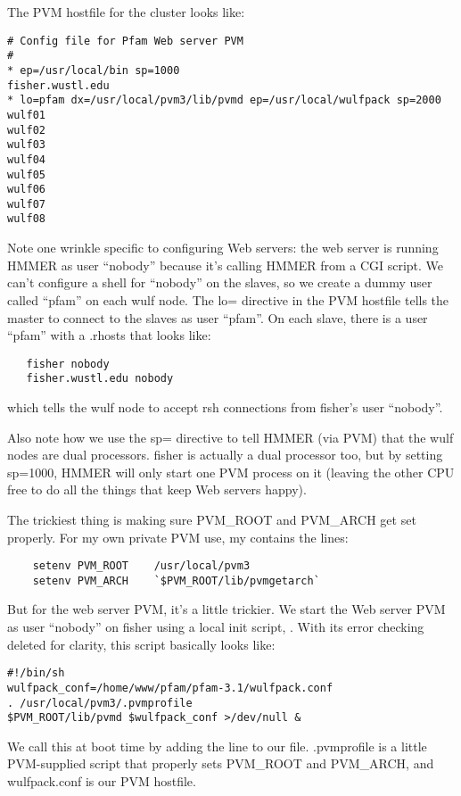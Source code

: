 The PVM hostfile for the cluster looks like:
\begin{verbatim}
# Config file for Pfam Web server PVM
#
* ep=/usr/local/bin sp=1000
fisher.wustl.edu
* lo=pfam dx=/usr/local/pvm3/lib/pvmd ep=/usr/local/wulfpack sp=2000
wulf01
wulf02
wulf03
wulf04
wulf05
wulf06
wulf07
wulf08
\end{verbatim}

Note one wrinkle specific to configuring Web servers: the web server
is running HMMER as user ``nobody'' because it's calling HMMER from a
CGI script. We can't configure a shell for ``nobody'' on the slaves,
so we create a dummy user called ``pfam'' on each wulf node.  The lo=
directive in the PVM hostfile tells the master to connect to the
slaves as user ``pfam''. On each slave, there is a user ``pfam'' with
a .rhosts that looks like:
\begin{verbatim}
   fisher nobody
   fisher.wustl.edu nobody
\end{verbatim}
which tells the wulf node to accept rsh connections from
fisher's user ``nobody''.

Also note how we use the sp= directive to tell HMMER (via PVM) that
the wulf nodes are dual processors. fisher is actually a dual
processor too, but by setting sp=1000, HMMER will only start one PVM
process on it (leaving the other CPU free to do all the things that
keep Web servers happy).

The trickiest thing is making sure PVM\_ROOT and PVM\_ARCH get set
properly.  For my own private PVM use, my  contains the lines:
\begin{verbatim}
	setenv PVM_ROOT    /usr/local/pvm3
	setenv PVM_ARCH    `$PVM_ROOT/lib/pvmgetarch`
\end{verbatim}
But for the web server PVM, it's a little trickier. We start the Web
server PVM as user ``nobody'' on fisher using a local init script,
. With its error checking deleted for
clarity, this script basically looks like:

\begin{verbatim}
#!/bin/sh
wulfpack_conf=/home/www/pfam/pfam-3.1/wulfpack.conf
. /usr/local/pvm3/.pvmprofile
$PVM_ROOT/lib/pvmd $wulfpack_conf >/dev/null &
\end{verbatim}

We call this at boot time by adding the line
to our  file. .pvmprofile is a little PVM-supplied
script that properly sets PVM\_ROOT and PVM\_ARCH, and wulfpack.conf
is our PVM hostfile.

